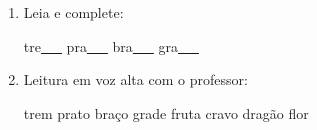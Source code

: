 \begin{exercicio}
\begin{enumerate}[resume]
\begin{enumerate}[label=(\alph*)]
    \item O som da unidade é: ( ) oral ( ) nasal ( ) vibrante

    \item A primeira sílaba de TREM é: ( ) TRA ( ) PLA

    \item As palavras da unidade aparecem: ( ) no início ( ) no meio ( ) no fim das palavras

  \end{enumerate}

  \item Leia e complete:
  \begin{center}
  tre\underline{~~~} \quad pra\underline{~~~} \quad bra\underline{~~~} \quad gra\underline{~~~}
  \end{center}

  \item Leitura em voz alta com o professor:
  \begin{center}
  trem \quad prato \quad braço \quad grade \quad fruta \quad cravo \quad dragão \quad flor
  \end{center}

\end{enumerate}

\end{exercicio}



